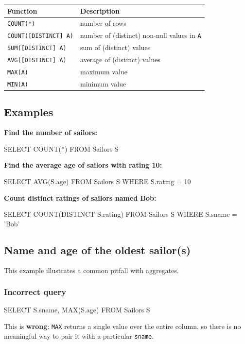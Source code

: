 \documentclass[../../dis.tex]{subfiles}
\begin{document}
\begin{center}
\begin{tabular}{@{}ll@{}}
    \toprule
    \textbf{Function} & \textbf{Description} \\
    \midrule
    \texttt{COUNT(*)}              & number of rows \\
    \texttt{COUNT([DISTINCT] A)}   & number of (distinct) non-null values in \texttt{A} \\
    \texttt{SUM([DISTINCT] A)}     & sum of (distinct) values \\
    \texttt{AVG([DISTINCT] A)}     & average of (distinct) values \\
    \texttt{MAX(A)}                & maximum value \\
    \texttt{MIN(A)}                & minimum value \\
    \bottomrule
\end{tabular}
\end{center}

\subsection{Examples}

\textbf{Find the number of sailors:}
\begin{sql}
    SELECT COUNT(*) FROM Sailors S
\end{sql}

\textbf{Find the average age of sailors with rating 10:}
\begin{sql}
    SELECT AVG(S.age) FROM Sailors S WHERE S.rating = 10
\end{sql}

\textbf{Count distinct ratings of sailors named Bob:}
\begin{sql}
    SELECT COUNT(DISTINCT S.rating) FROM Sailors S WHERE S.sname = 'Bob'
\end{sql}

\subsection{Name and age of the oldest sailor(s)}
This example illustrates a common pitfall with aggregates.

\subsubsection*{Incorrect query}
\begin{sql}
    SELECT S.sname, MAX(S.age) FROM Sailors S
\end{sql}
This is \textbf{wrong}: \texttt{MAX} returns a single value over the entire column, so there is no meaningful way to pair it with a particular \texttt{sname}.
\end{document}
